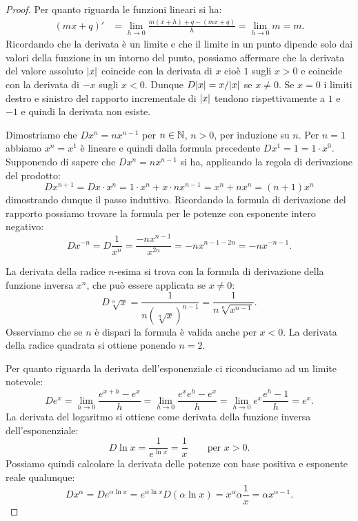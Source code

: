 \begin{proof}
\mymark{**}
Per quanto riguarda le funzioni lineari si ha:
\begin{align*}
(mx+q)' &= \lim_{h\to 0}\frac{m(x+h)+q - (mx+q)}{h} = \lim_{h\to 0} m = m.
\end{align*}
Ricordando che la derivata è un limite e che il limite in un punto dipende 
solo dai valori della funzione in un intorno del punto, 
possiamo affermare che la derivata del valore assoluto ${\left|x\right|}$ 
coincide con la derivata di $x$ cioè $1$ sugli $x>0$ e coincide 
con la derivata di $-x$ sugli $x<0$. Dunque $D {\left|x\right|} = x / {\left|x\right|}$ 
se $x\neq 0$. 
Se $x=0$ i limiti destro e sinistro del rapporto incrementale di ${\left|x\right|}$ 
tendono rispettivamente a $1$ e $-1$ e quindi la derivata non esiste.

Dimostriamo che $Dx^n = n x^{n-1}$ per $n\in {\mathbb N}$, $n>0$, 
per induzione su $n$. Per $n=1$ abbiamo $x^n=x^1$ è lineare 
e quindi dalla formula precedente $Dx^1 = 1 = 1 \cdot x^0$. 
Supponendo di sapere che $D x^n = n x^{n-1}$ si ha, applicando 
la regola di derivazione del prodotto:
\[
  D x^{n+1} = D x\cdot x^n = 1 \cdot x^n + x \cdot n x^{n-1}
   = x^n + n x^n = (n+1) x^n
\]
dimostrando dunque il passo induttivo.
Ricordando la formula di derivazione del rapporto
possiamo trovare la formula per le potenze con esponente intero negativo:
\[
  D x^{-n} = D \frac{1}{x^n} = \frac{-n x^{n-1}}{x^{2n}}
   = -n x^{n-1-2n} = -n x^{-n-1}.
\]

La derivata della radice $n$-esima si trova con la formula di derivazione della funzione inversa $x^n$, che può essere applicata se $x\neq 0$:
\[
  D \sqrt[n]{x} = \frac{1}{n(\sqrt[n]{x})^{n-1}}
    = \frac{1}{n\sqrt[n]{x^{n-1}}}.
\]
Osserviamo che se $n$ è dispari la formula è valida anche per $x<0$.
La derivata della radice quadrata si ottiene ponendo $n=2$.

Per quanto riguarda la derivata dell'esponenziale
ci riconduciamo ad un limite notevole:
\[
  D e^x = \lim_{h\to 0} \frac{e^{x+h}-e^x}{h}
  = \lim_{h\to 0}\frac{e^x e^h - e^x}{h}
  = \lim_{h\to 0}e^x \frac{e^h - 1}{h}
  = e^x.
\]
La derivata del logaritmo si ottiene come derivata della funzione inversa dell'esponenziale:
\[
  D \ln x = \frac{1}{e^{\ln x}} = \frac{1}{x} \qquad\text{per $x>0$}.
\]
Possiamo quindi calcolare la derivata delle potenze con base positiva e esponente reale qualunque:
\[
D x^\alpha
= D e^{\alpha \ln x}
= e^{\alpha \ln x} D(\alpha \ln x)
= x^\alpha \alpha \frac{1}{x}
= \alpha x^{\alpha -1}.
\]


\end{proof}
